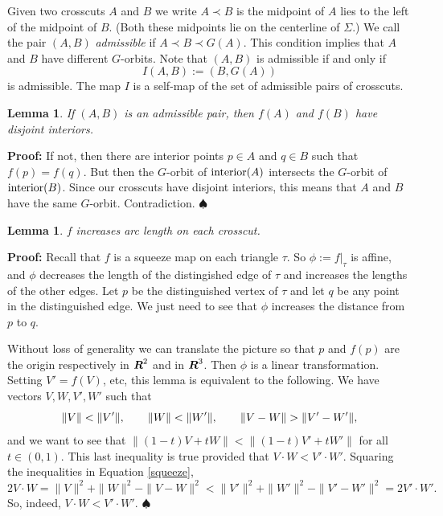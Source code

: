 \documentclass[12pt]{article}
\newtheorem{lemma}[theorem]{Lemma}
\def\startproof{{\bf {\medskip}{\noindent}Proof: }}
\def\endproof{$\spadesuit$  \newline}
\def\R{\mbox{\boldmath{$R$}}}%
\begin{document}
Given two crosscuts
$A$ and $B$ we write $A \prec B$ is the midpoint of $A$ lies
to the left of the midpoint of $B$. (Both these midpoints lie on the
centerline of $\Sigma$.)   We call the pair
$(A,B)$ {\it admissible\/} if $A \prec B \prec G(A)$.
This condition implies that $A$ and $B$ have
different $G$-orbits.
Note that $(A,B)$ is admissible if and only if
\begin{equation}
  \label{involute}
  I(A,B):=(B,G(A))
\end{equation}
is admissible. The map $I$ is a self-map of the set of admissible
pairs of crosscuts.

\begin{lemma}
  \label{adm}
  If $(A,B)$ is an admissible pair, then
  $f(A)$ and $f(B)$ have disjoint interiors.
\end{lemma}

\startproof
If not, then
there are interior points $p \in A$ and $q \in B$ such
that $f(p)=f(q)$.  But then the $G$-orbit of
${\rm interior\/}(A)$ intersects the $G$-orbit of ${\rm interior\/}(B)$.   Since our
crosscuts have disjoint interiors, this means
that $A$ and $B$ have the same $G$-orbit.
Contradiction.
\endproof

\begin{lemma}
  \label{expand}
  $f$ increases arc length on each crosscut.
\end{lemma}

\startproof
Recall that $f$ is a squeeze map on each triangle $\tau$.
So $\phi:=f|_{\tau}$ is affine, and $\phi$ decreases the length of
the distingished edge of $\tau$ and increases the lengths of
the other edges.
Let $p$ be the distinguished vertex of $\tau$
and let $q$ be any point in the distinguished
edge.  We just need to see that $\phi$ increases the distance from
$p$ to $q$.

Without loss of generality we can translate
the picture so that $p$ and $f(p)$ are the origin respectively
in $\R^2$ and in $\R^3$.   Then $\phi$ is a linear
transformation.  Setting $V'=f(V)$, etc, this
lemma is equivalent to the following.  We have
vectors $V,W,V',W'$ such that
\begin{equation}
  \label{squeeze}
\|V\|<\|V'\|, \hskip 20 pt
\|W\|<\|W'\|, \hskip 20 pt
\|V-W\|>\|V'-W'\|,
\end{equation}
and we want to see that
$\|(1-t)V+tW\|<\|(1-t)V'+tW'\|$
for all $t \in (0,1)$.
This last inequality is true provided that
$V \cdot W < V'\cdot W'$.
Squaring the inequalities in Equation \ref{squeeze},
$$2V \cdot W = \|V\|^2 + \|W\|^2  - \|V-W\|^2<
\|V'\|^2+\|W'\|^2 - \|V'-W'\|^2 = 2V' \cdot W'.$$
So, indeed, $V \cdot W < V' \cdot W'$.
\endproof
\end{document}
